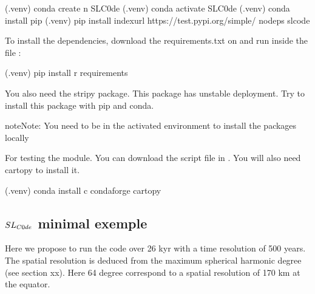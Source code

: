 \documentclass[letterpaper,10pt,english]{sphinxmanual}
\begin{document}
\begin{sphinxVerbatim}[commandchars=\\\{\}]
(.venv) \PYGZdl{} conda create \PYGZhy{}n SL\PYGZus{}C0de
(.venv) \PYGZdl{} conda activate SL\PYGZus{}C0de
(.venv) \PYGZdl{} conda install pip
(.venv) \PYGZdl{} pip install \PYGZhy{}\PYGZhy{}index\PYGZhy{}url https://test.pypi.org/simple/ \PYGZhy{}\PYGZhy{}no\PYGZhy{}deps slcode
\end{sphinxVerbatim}

\sphinxAtStartPar
To install the dependencies, download the requirements.txt on  and run inside the file :

\begin{sphinxVerbatim}[commandchars=\\\{\}]
(.venv) \PYGZdl{} pip install \PYGZhy{}r requirements
\end{sphinxVerbatim}

\sphinxAtStartPar
You also need the stripy package. This package has unstable deployment. Try to install this package with pip and conda.

\begin{sphinxadmonition}{note}{Note:}
\sphinxAtStartPar
You need to be in the activated environment to install the packages locally
\end{sphinxadmonition}

\sphinxAtStartPar
For testing the module. You can download the script file in . You will also need cartopy to install it.

\begin{sphinxVerbatim}[commandchars=\\\{\}]
(.venv) \PYGZdl{} conda install \PYGZhy{}c conda\PYGZhy{}forge cartopy
\end{sphinxVerbatim}


\subsection{\protect\(SL_{C0de}\protect\) minimal exemple}
\label{\detokenize{usage:sl-c0de-minimal-exemple}}
\sphinxAtStartPar
Here we propose to run the code over 26 kyr with a time resolution of 500 years. The spatial resolution is deduced from the maximum spherical harmonic degree (see section xx). Here 64 degree correspond to a spatial resolution of 170 km at the equator.
\end{document}
